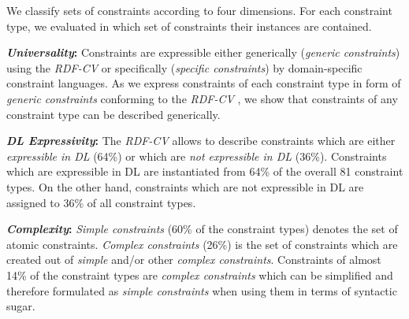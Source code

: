 \documentclass[a4paper,fontsize=11pt]{scrartcl}
\begin{document}
We classify sets of constraints according to four dimensions.
For each constraint type, we evaluated \cite{BoschNolleAcarEckert2015} in which set of constraints their instances are contained.

\textbf{\emph{Universality}:}
Constraints are expressible either generically (\emph{generic constraints}) using the \emph{RDF-CV}   
or specifically (\emph{specific constraints}) by domain-specific constraint languages. 
As we express constraints of each constraint type in form of \emph{generic constraints} conforming to the \emph{RDF-CV} \cite{BoschNolleAcarEckert2015},
we show that constraints of any constraint type can be described generically.

\textbf{\emph{DL Expressivity}:}
The \emph{RDF-CV} allows to describe 
constraints which are either \emph{expressible in DL} (64\%) or which are \emph{not expressible in DL} (36\%). Constraints which are expressible in DL are instantiated from 64\% of the overall 81 constraint types. On the other hand, constraints which are not expressible in DL are assigned to 36\% of all constraint types.

\textbf{\emph{Complexity}:}
\emph{Simple constraints} (60\% of the constraint types) denotes the set of atomic constraints. 
\emph{Complex constraints} (26\%) is the set of constraints which are created out of \emph{simple} and/or other \emph{complex constraints}.
Constraints of almost 14\% of the constraint types are \emph{complex constraints} which can be simplified and therefore formulated as \emph{simple constraints} when using them in terms of syntactic sugar.
\end{document}
